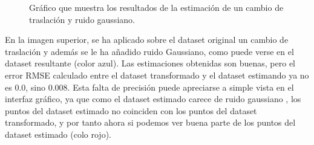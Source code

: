 \begin{figure}[H]
\begin{center}
\hspace{0.5cm}

\end{center}

\caption{Gráfico que muestra los resultados de la estimación de un cambio de traslación y ruido gaussiano.}
\end{figure}
En la imagen superior, se ha aplicado sobre el dataset original un cambio de traslación y además se le ha añadido ruido Gaussiano, como puede verse en el dataset resultante (color azul). Las estimaciones obtenidas son buenas, pero el error RMSE calculado entre el dataset transformado y el dataset estimando ya no es 0.0, sino 0.008. Esta falta de precisión puede apreciarse a simple vista en el interfaz gráfico, ya que como el dataset estimado carece de ruido gaussiano , los puntos del dataset estimado no coinciden con los puntos del dataset transformado, y por tanto ahora si podemos ver buena parte de los puntos del dataset estimado (colo rojo).


